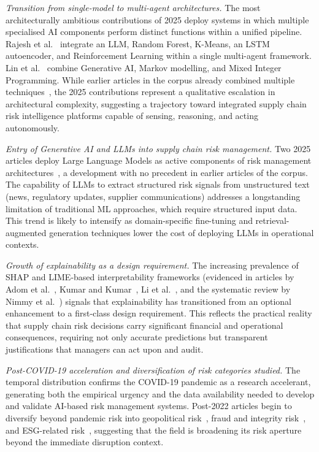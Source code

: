 \textit{Transition from single-model to multi-agent architectures.} The most architecturally ambitious contributions of 2025 deploy systems in which multiple specialised AI components perform distinct functions within a unified pipeline. Rajesh et al.~\cite{rajesh2025smartops} integrate an LLM, Random Forest, K-Means, an LSTM autoencoder, and Reinforcement Learning within a single multi-agent framework. Lin et al.~\cite{lin2025generative} combine Generative AI, Markov modelling, and Mixed Integer Programming. While earlier articles in the corpus already combined multiple techniques~\cite{kumar2023enhancing,nayal2022exploring,deivaganesh2022supply}, the 2025 contributions represent a qualitative escalation in architectural complexity, suggesting a trajectory toward integrated supply chain risk intelligence platforms capable of sensing, reasoning, and acting autonomously.

\textit{Entry of Generative AI and LLMs into supply chain risk management.} Two 2025 articles deploy Large Language Models as active components of risk management architectures~\cite{lin2025generative,rajesh2025smartops}, a development with no precedent in earlier articles of the corpus. The capability of LLMs to extract structured risk signals from unstructured text (news, regulatory updates, supplier communications) addresses a longstanding limitation of traditional ML approaches, which require structured input data. This trend is likely to intensify as domain-specific fine-tuning and retrieval-augmented generation techniques lower the cost of deploying LLMs in operational contexts.

\textit{Growth of explainability as a design requirement.} The increasing prevalence of SHAP and LIME-based interpretability frameworks (evidenced in articles by Adom et al.~\cite{adom2025design}, Kumar and Kumar~\cite{kumar2023enhancing}, Li et al.~\cite{li2025endtoend}, and the systematic review by Nimmy et al.~\cite{nimmy2022explainability}) signals that explainability has transitioned from an optional enhancement to a first-class design requirement. This reflects the practical reality that supply chain risk decisions carry significant financial and operational consequences, requiring not only accurate predictions but transparent justifications that managers can act upon and audit.

\textit{Post-COVID-19 acceleration and diversification of risk categories studied.} The temporal distribution confirms the COVID-19 pandemic as a research accelerant, generating both the empirical urgency and the data availability needed to develop and validate AI-based risk management systems. Post-2022 articles begin to diversify beyond pandemic risk into geopolitical risk~\cite{aldehayyat2025applying}, fraud and integrity risk~\cite{lin2025generative}, and ESG-related risk~\cite{rajesh2025smartops}, suggesting that the field is broadening its risk aperture beyond the immediate disruption context.

